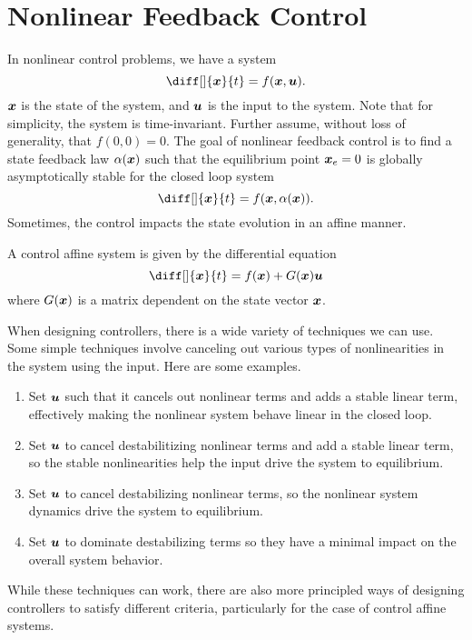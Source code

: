 \section{Nonlinear Feedback Control}
In nonlinear control problems, we have a system \[
	\diff[]{\bs{x}}{t} = f(\bs{x}, \bs{u}).
\]
$\boldsymbol{x}$ is the state of the system, and $\boldsymbol{u}$ is the input to the system.
Note that for simplicity, the system is time-invariant. Further assume, without
loss of generality, that $f(0, 0) = 0$. The goal of nonlinear feedback control
is to find a state feedback law $\alpha(\boldsymbol{x})$ such that the equilibrium point
$\boldsymbol{x}_e = 0$ is globally asymptotically stable for the closed loop system \[
	\diff[]{\bs{x}}{t} = f(\bs{x}, \alpha(\bs{x})).
\]
Sometimes, the control impacts the state evolution in an affine manner.
\begin{definition}
	A control affine system is given by the differential equation \[
		\diff[]{\bs{x}}{t} = f(\bs{x}) + G(\bs{x})\bs{u}
	\] where $G(\boldsymbol{x})$ is a matrix dependent on the state vector $\boldsymbol{x}$.
	\label{defn:control-affine}
\end{definition}

When designing controllers, there is a wide variety of techniques we can use.
Some simple techniques involve canceling out various types of nonlinearities in
the system using the input. Here are some examples.
\begin{enumerate}
	\item Set $\boldsymbol{u}$ such that it cancels out nonlinear terms and adds a stable
		linear term, effectively making the nonlinear system behave linear in the
		closed loop.
	\item Set $\boldsymbol{u}$ to cancel destabilitizing nonlinear terms and add a stable
		linear term, so the stable nonlinearities help the input drive the system to
		equilibrium.
	\item Set $\boldsymbol{u}$ to cancel destabilizing nonlinear terms, so the nonlinear
		system dynamics drive the system to equilibrium.
	\item Set $\boldsymbol{u}$ to dominate destabilizing terms so they have a minimal
		impact on the overall system behavior.
\end{enumerate}
While these techniques can work, there are also more principled ways of
designing controllers to satisfy different criteria, particularly for the case
of control affine systems.
